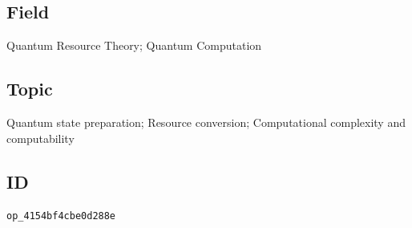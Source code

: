 \subsection*{Field}

Quantum Resource Theory; Quantum Computation

\subsection*{Topic}

Quantum state preparation; Resource conversion; Computational complexity and computability

\subsection*{ID}

\texttt{op\_4154bf4cbe0d288e}
